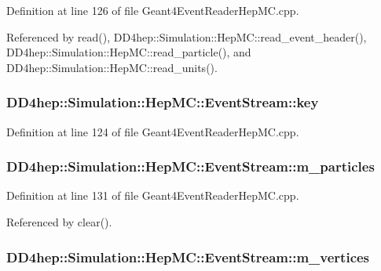 Definition at line 126 of file Geant4EventReaderHepMC.cpp.

Referenced by read(), DD4hep::Simulation::HepMC::read\_\-event\_\-header(), DD4hep::Simulation::HepMC::read\_\-particle(), and DD4hep::Simulation::HepMC::read\_\-units().\hypertarget{class_d_d4hep_1_1_simulation_1_1_hep_m_c_1_1_event_stream_ac17d00d243288f0b1dec90a167b57868}{
\subsubsection[{key}]{ {\bf DD4hep::Simulation::HepMC::EventStream::key}}}
\label{class_d_d4hep_1_1_simulation_1_1_hep_m_c_1_1_event_stream_ac17d00d243288f0b1dec90a167b57868}


Definition at line 124 of file Geant4EventReaderHepMC.cpp.\hypertarget{class_d_d4hep_1_1_simulation_1_1_hep_m_c_1_1_event_stream_a40291edf72d71405515c98ea77e6670c}{
\subsubsection[{m\_\-particles}]{ {\bf DD4hep::Simulation::HepMC::EventStream::m\_\-particles}}}
\label{class_d_d4hep_1_1_simulation_1_1_hep_m_c_1_1_event_stream_a40291edf72d71405515c98ea77e6670c}


Definition at line 131 of file Geant4EventReaderHepMC.cpp.

Referenced by clear().\hypertarget{class_d_d4hep_1_1_simulation_1_1_hep_m_c_1_1_event_stream_a714f7fea3a85b72aa7c925c580a2fe36}{
\subsubsection[{m\_\-vertices}]{ {\bf DD4hep::Simulation::HepMC::EventStream::m\_\-vertices}}}
\label{class_d_d4hep_1_1_simulation_1_1_hep_m_c_1_1_event_stream_a714f7fea3a85b72aa7c925c580a2fe36}


